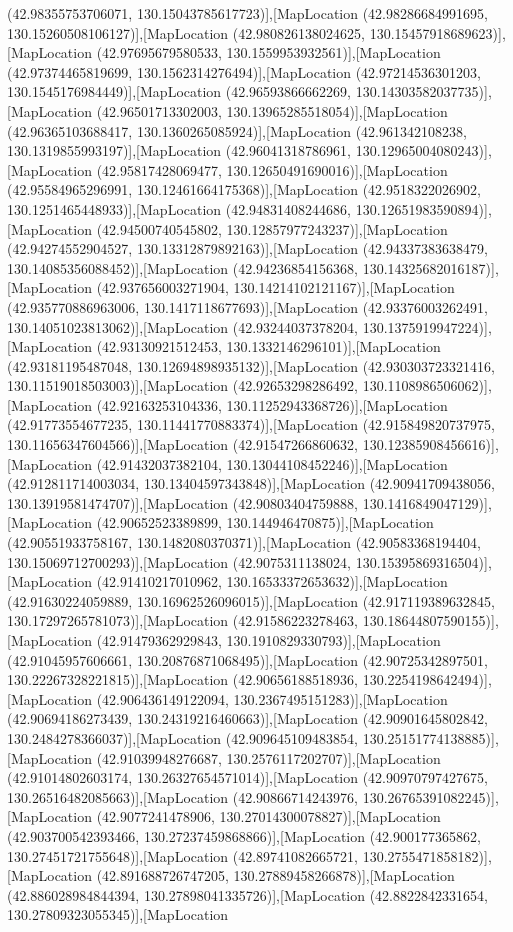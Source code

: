 (42.98355753706071, 130.15043785617723)],[MapLocation (42.98286684991695, 130.15260508106127)],[MapLocation (42.980826138024625, 130.15457918689623)],[MapLocation (42.97695679580533, 130.1559953932561)],[MapLocation (42.97374465819699, 130.1562314276494)],[MapLocation (42.97214536301203, 130.1545176984449)],[MapLocation (42.96593866662269, 130.14303582037735)],[MapLocation (42.96501713302003, 130.13965285518054)],[MapLocation (42.96365103688417, 130.1360265085924)],[MapLocation (42.961342108238, 130.1319855993197)],[MapLocation (42.96041318786961, 130.12965004080243)],[MapLocation (42.95817428069477, 130.12650491690016)],[MapLocation (42.95584965296991, 130.12461664175368)],[MapLocation (42.9518322026902, 130.1251465448933)],[MapLocation (42.94831408244686, 130.12651983590894)],[MapLocation (42.94500740545802, 130.12857977243237)],[MapLocation (42.94274552904527, 130.13312879892163)],[MapLocation (42.94337383638479, 130.14085356088452)],[MapLocation (42.94236854156368, 130.14325682016187)],[MapLocation (42.937656003271904, 130.14214102121167)],[MapLocation (42.935770886963006, 130.1417118677693)],[MapLocation (42.93376003262491, 130.14051023813062)],[MapLocation (42.93244037378204, 130.1375919947224)],[MapLocation (42.93130921512453, 130.1332146296101)],[MapLocation (42.93181195487048, 130.12694898935132)],[MapLocation (42.930303723321416, 130.11519018503003)],[MapLocation (42.92653298286492, 130.1108986506062)],[MapLocation (42.92163253104336, 130.11252943368726)],[MapLocation (42.91773554677235, 130.11441770883374)],[MapLocation (42.915849820737975, 130.11656347604566)],[MapLocation (42.91547266860632, 130.12385908456616)],[MapLocation (42.91432037382104, 130.13044108452246)],[MapLocation (42.912811714003034, 130.13404597343848)],[MapLocation (42.90941709438056, 130.13919581474707)],[MapLocation (42.90803404759888, 130.1416849047129)],[MapLocation (42.90652523389899, 130.144946470875)],[MapLocation (42.90551933758167, 130.1482080370371)],[MapLocation (42.90583368194404, 130.15069712700293)],[MapLocation (42.9075311138024, 130.15395869316504)],[MapLocation (42.91410217010962, 130.16533372653632)],[MapLocation (42.91630224059889, 130.16962526096015)],[MapLocation (42.917119389632845, 130.17297265781073)],[MapLocation (42.91586223278463, 130.18644807590155)],[MapLocation (42.91479362929843, 130.1910829330793)],[MapLocation (42.91045957606661, 130.20876871068495)],[MapLocation (42.90725342897501, 130.22267328221815)],[MapLocation (42.90656188518936, 130.2254198642494)],[MapLocation (42.906436149122094, 130.2367495151283)],[MapLocation (42.90694186273439, 130.24319216460663)],[MapLocation (42.90901645802842, 130.2484278366037)],[MapLocation (42.909645109483854, 130.25151774138885)],[MapLocation (42.91039948276687, 130.2576117202707)],[MapLocation (42.91014802603174, 130.26327654571014)],[MapLocation (42.90970797427675, 130.26516482085663)],[MapLocation (42.90866714243976, 130.26765391082245)],[MapLocation (42.9077241478906, 130.27014300078827)],[MapLocation (42.903700542393466, 130.27237459868866)],[MapLocation (42.900177365862, 130.27451721755648)],[MapLocation (42.89741082665721, 130.2755471858182)],[MapLocation (42.891688726747205, 130.27889458266878)],[MapLocation (42.886028984844394, 130.27898041335726)],[MapLocation (42.8822842331654, 130.27809323055345)],[MapLocation 